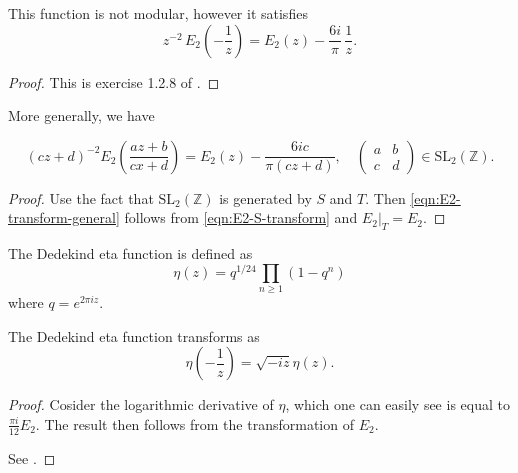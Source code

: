 \begin{lemma}\label{lemma:E2-transform-S}\leanok{}
This function is not modular, however it satisfies
\begin{equation}\label{eqn:E2-S-transform}
    z^{-2}\,E_2\left(-\frac{1}{z}\right) = E_2(z) -\frac{6i}{\pi}\, \frac{1}{z}.
\end{equation}
\end{lemma}

\begin{proof}\leanok
This is exercise 1.2.8 of \cite{first course}.
\end{proof}

More generally, we have
\begin{lemma}\label{lemma:E2-transform-general}\leanok{}
\begin{equation}\label{eqn:E2-transform-general}
(cz + d)^{-2} E_2\left(\frac{az + b}{cx + d}\right) = E_2(z) - \frac{6ic}{\pi (cz + d)}, \quad \begin{pmatrix} a & b \\ c & d\end{pmatrix} \in \mathrm{SL}_{2}(\mathbb{Z}).
\end{equation}
\end{lemma}
\begin{proof}
    \leanok
    Use the fact that $\mathrm{SL}_2(\mathbb{Z})$ is generated by $S$ and $T$.
    Then \eqref{eqn:E2-transform-general} follows from \eqref{eqn:E2-S-transform} and $E_2|_T = E_2$.
\end{proof}

\begin{definition}\label{def:dedekind_eta}\leanok {}
The Dedekind eta function is defined as
$$
    \eta(z) = q^{1/24} \prod_{n \ge 1} (1 - q^n)
$$
where $q = e^{2\pi i z}$.
\end{definition}

\begin{lemma}\label{lemma:dedekind_eta_transformation}
The Dedekind eta function transforms as
$$
    \eta\left(-\frac{1}{z}\right) = \sqrt{-iz} \eta(z).
$$
\end{lemma}
\begin{proof}
    \leanok
    Cosider the logarithmic derivative of $\eta$, which one can easily see is equal to $\frac{\pi i}{12} E_2$.
    The result then follows from the transformation of $E_2$.

    See \cite[proposition 1.2.5]{first course}.
\end{proof}


